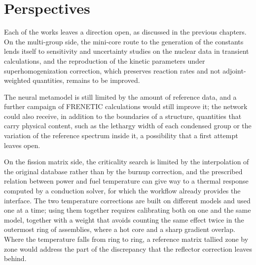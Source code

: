 \section{Perspectives}

Each of the works leaves a direction open, as discussed in the previous
chapters. On the multi-group side, the mini-core route to the generation of
the constants lends itself to sensitivity and uncertainty studies on the nuclear data in
transient calculations, and the reproduction of the kinetic
parameters under superhomogenization correction, which preserves reaction rates
and not adjoint-weighted quantities, remains to be improved.

The neural metamodel is still limited by the amount of reference data, and a further
campaign of FRENETIC calculations would still improve it; the network could also receive, in
addition to the boundaries of a structure, quantities that carry physical
content, such as the lethargy width of each condensed group or the variation of
the reference spectrum inside it, a possibility that a first attempt leaves open.

On the fission matrix side, the criticality search is limited by the
interpolation of the original database rather than by the burnup correction, and
the prescribed relation between power and fuel temperature can give way to a
thermal response computed by a conduction solver, for which the workflow
already provides the interface. The two temperature corrections are built on
different models and used one at a time; using them together requires
calibrating both on one and the same model, together with a weight that avoids
counting the same effect twice in the outermost ring of assemblies, where a hot
core and a sharp gradient overlap. Where the temperature falls from ring to ring, a reference
matrix tallied zone by zone would address the part of the discrepancy that the
reflector correction leaves behind.
